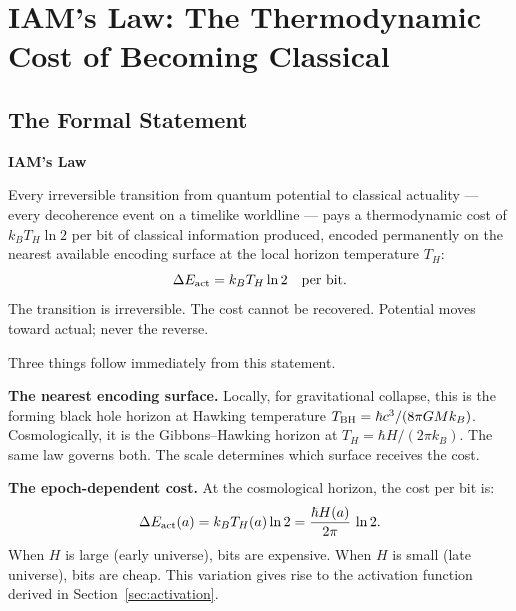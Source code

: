 \documentclass[12pt,a4paper]{article}
\begin{document}
\newpage

\section{IAM's Law: The Thermodynamic Cost of Becoming Classical}
\label{sec:iamslaw}

\subsection{The Formal Statement}

\begin{keybox}
\begin{center}
\textbf{IAM's Law}
\end{center}
Every irreversible transition from quantum potential to classical actuality ---
every decoherence event on a timelike worldline --- pays a thermodynamic cost
of $k_B T_H \ln 2$ per bit of classical information produced, encoded
permanently on the nearest available encoding surface at the local horizon
temperature $T_H$:
\begin{equation}
\Delta E_{\rm act} = k_B T_H \ln 2 \quad \text{per bit.}
\label{eq:iamslaw}
\end{equation}
The transition is irreversible. The cost cannot be recovered.
Potential moves toward actual; never the reverse.
\end{keybox}

Three things follow immediately from this statement.

\textbf{The nearest encoding surface.} Locally, for gravitational collapse, this
is the forming black hole horizon at Hawking temperature $T_{\rm BH} = \hbar c^3
/(8\pi GM k_B)$. Cosmologically, it is the Gibbons--Hawking horizon at
$T_H = \hbar H/(2\pi k_B)$. The same law governs both. The scale determines
which surface receives the cost.

\textbf{The epoch-dependent cost.} At the cosmological horizon, the cost per bit
is:
\begin{equation}
\Delta E_{\rm act}(a) = k_B T_H(a) \ln 2 = \frac{\hbar H(a)}{2\pi}\,\ln 2.
\end{equation}
When $H$ is large (early universe), bits are expensive. When $H$ is small
(late universe), bits are cheap. This variation gives rise to the activation
function derived in Section~\ref{sec:activation}.
\end{document}
